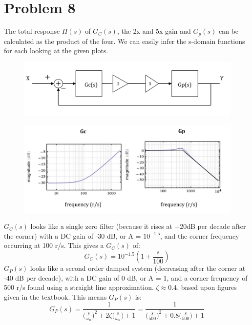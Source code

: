 \documentclass[12pt,letterpaper]{article}
\begin{document}
\section{Problem 8}
The total response $H(s)$ of $G_C(s)$, the 2x and 5x gain and $G_p(s)$ can be calculated as the product of the four. We can easily infer the s-domain functions for each looking at the given plots.
\begin{figure}[h!]
\begin{center}
 \includegraphics[scale=0.4]{./plots/g.png}
\end{center}
\end{figure}
\FloatBarrier
\begin{figure}[h!]
\begin{center}
 \includegraphics[scale=0.4]{./plots/f.png}
\end{center}
\end{figure}
\FloatBarrier
$G_C(s)$ looks like a single zero filter (because it rises at +20dB per decade after the corner) with a DC gain of -30 dB, or A = $10^{-1.5}$, and the corner frequency occurring at 100 r/s. This gives a $G_C(s)$ of:
\begin{equation}
G_C(s)=10^{-1.5}(1+\frac{s}{100})
\end{equation}
$G_P(s)$ looks like a second order damped system (decreasing after the corner at -40 dB per decade), with a DC gain of 0 dB, or A = 1, and a corner frequency of 500 r/s found using a straight line approximation. $\zeta \approx 0.4$, based upon figures given in the textbook. This means $G_P(s)$ is:
\begin{equation}
G_P(s) =\frac{1}{\big(\frac{s}{\omega_n}\big)^2+2\zeta\big(\frac{s}{\omega_n}\big)+1} =\frac{1}{\big(\frac{s}{500}\big)^2+0.8\big(\frac{s}{500}\big)+1}
\end{equation}
\end{document}
